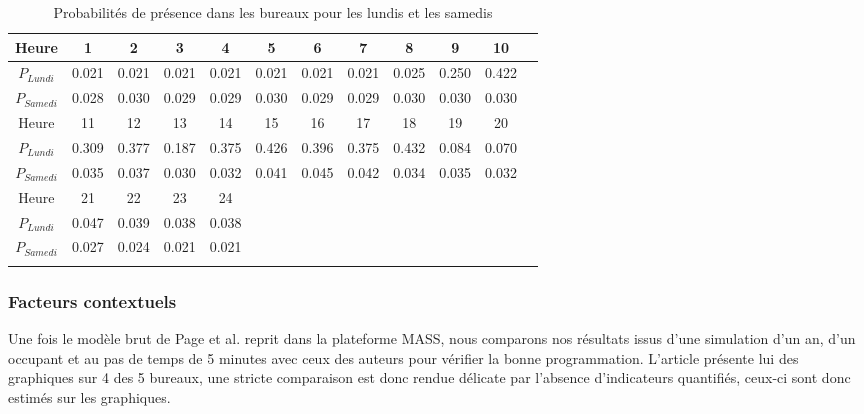 \begin{table}[H]
\begin{tabular}{|c|c|c|c|c|c|c|c|c|c|c|c|}
\hline 
Heure & 1 & 2 & 3 & 4 & 5 & 6 & 7 & 8 & 9 & 10  \\ 
\hline 
$P_{Lundi}$ & 0.021 & 0.021 & 0.021 & 0.021 & 0.021 & 0.021 & 0.021 & 0.025 & 0.250 & 0.422  \\ 
\hline 
$P_{Samedi}$ & 0.028 & 0.030 & 0.029 & 0.029 & 0.030 & 0.029 & 0.029 & 0.030 & 0.030 & 0.030  \\ 
\hline
Heure & 11 & 12 & 13 & 14 & 15 & 16 & 17 & 18 & 19 & 20 \\ 
\hline 
$P_{Lundi}$ & 0.309 & 0.377 & 0.187 & 0.375 & 0.426 & 0.396 & 0.375 & 0.432 & 0.084 & 0.070 \\ 
\hline 
$P_{Samedi}$ & 0.035 & 0.037 & 0.030 & 0.032 & 0.041 & 0.045 & 0.042 & 0.034 & 0.035 & 0.032 \\ 
\hline 
Heure & 21 & 22 & 23 & 24 & \cellcolor{lightgray}& \cellcolor{lightgray}& \cellcolor{lightgray}& \cellcolor{lightgray}& \cellcolor{lightgray}& \cellcolor{lightgray}\\ 
\hline 
$P_{Lundi}$ & 0.047 & 0.039 & 0.038 & 0.038 & \cellcolor{lightgray} &\cellcolor{lightgray} &\cellcolor{lightgray} &\cellcolor{lightgray} &\cellcolor{lightgray} & \cellcolor{lightgray}\\ 
\hline 
$P_{Samedi}$ & 0.027 & 0.024 & 0.021 & 0.021 &\cellcolor{lightgray} &\cellcolor{lightgray} &\cellcolor{lightgray} & \cellcolor{lightgray}&\cellcolor{lightgray} &\cellcolor{lightgray}  \\ 
\hline 
\label{PPage}
\end{tabular}
\caption{Probabilités de présence dans les bureaux pour les lundis et les samedis}
\end{table}

\subsubsection{Facteurs contextuels}
\label{Facteurs contextuels}

Une fois le modèle brut de Page et al. \cite{Page-08} reprit dans la plateforme MASS, nous comparons nos résultats issus d'une simulation d'un an, d'un occupant et au pas de temps de 5 minutes avec ceux des auteurs pour vérifier la bonne programmation. L'article présente lui des graphiques sur 4 des 5 bureaux, une stricte comparaison est donc rendue délicate par l'absence d'indicateurs quantifiés, ceux-ci sont donc estimés sur les graphiques.

